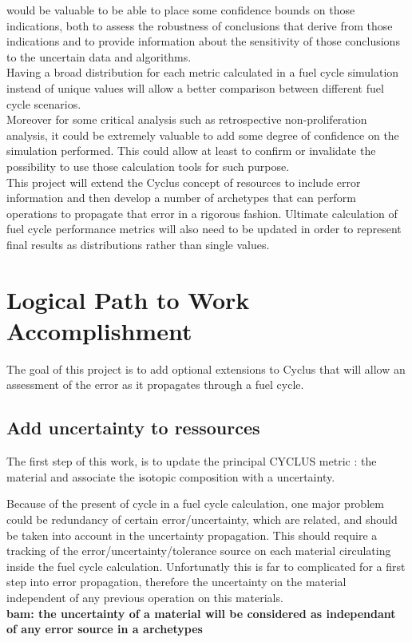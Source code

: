 \documentclass[dvips,12pt]{article}
\newcommand{\comment}[1]
{{\bfseries \color{red} #1}}
\begin{document}
would be valuable to be able to place some
confidence bounds on those indications, both to
assess the robustness of conclusions that derive
from those indications and to provide information
about the sensitivity of those conclusions to the
uncertain data and algorithms.\\ Having a broad
distribution for each metric calculated in a fuel
cycle simulation instead of unique values will
allow a better comparison between different fuel
cycle scenarios.\\ Moreover for some critical
analysis such as retrospective non-proliferation
analysis, it could be extremely valuable to add
some degree of confidence on the simulation
performed. This could allow at least to confirm or
invalidate the possibility to use those
calculation tools for such purpose.\\ This project
will extend the Cyclus concept of resources to
include error information and then develop a
number of archetypes that can perform operations
to propagate that error in a rigorous fashion.
Ultimate calculation of fuel cycle performance
metrics will also need to be updated in order to
represent final results as distributions rather
than single values.

\section{Logical Path to Work Accomplishment}
The goal of this project is to add optional
extensions to Cyclus that will allow an assessment
of the error as it propagates through a fuel
cycle.

\subsection{Add uncertainty to ressources}
The first step of this work, is to update the
principal CYCLUS metric : the material and
associate the isotopic composition with a
uncertainty. 

Because of the present of cycle in a fuel cycle
calculation, one major problem could be redundancy
of certain error/uncertainty, which are related,
and should be taken into account in the
uncertainty propagation. This should require a
tracking of the error/uncertainty/tolerance source
on each material circulating inside the fuel cycle
calculation. Unfortunatly this is far to
complicated for a first step into error
propagation, therefore the uncertainty on the
material independent of any previous operation on
this materials.\\
\comment{bam: the uncertainty of a material will
be considered as independant of any error source
in a archetypes}
\end{document}
